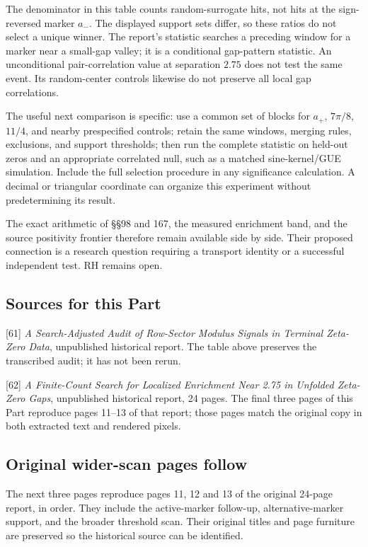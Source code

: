 \documentclass[
  11pt,
]{book}
\begin{document}
The denominator in this table counts random-surrogate hits, not hits at
the sign-reversed marker \(a_-\). The displayed support sets differ, so
these ratios do not select a unique winner. The report's statistic
searches a preceding window for a marker near a small-gap valley; it is
a conditional gap-pattern statistic. An unconditional pair-correlation
value at separation \(2.75\) does not test the same event. Its
random-center controls likewise do not preserve all local gap
correlations.

The useful next comparison is specific: use a common set of blocks for
\(a_+\), \(7\pi/8\), \(11/4\), and nearby prespecified controls; retain
the same windows, merging rules, exclusions, and support thresholds;
then run the complete statistic on held-out zeros and an appropriate
correlated null, such as a matched sine-kernel/GUE simulation. Include
the full selection procedure in any significance calculation. A decimal
or triangular coordinate can organize this experiment without
predetermining its result.

The exact arithmetic of §§98 and 167, the measured enrichment band, and
the source positivity frontier therefore remain available side by side.
Their proposed connection is a research question requiring a transport
identity or a successful independent test. RH remains open.

\subsection{Sources for this Part}\label{sources-for-this-part}

{[}61{]} \emph{A Search-Adjusted Audit of Row-Sector Modulus Signals in
Terminal Zeta-Zero Data}, unpublished historical report. The table above
preserves the transcribed audit; it has not been rerun.

{[}62{]} \emph{A Finite-Count Search for Localized Enrichment Near 2.75
in Unfolded Zeta-Zero Gaps}, unpublished historical report, 24 pages.
The final three pages of this Part reproduce pages 11--13 of that
report; those pages match the original copy in both extracted text and
rendered pixels.

\subsection{Original wider-scan pages
follow}\label{original-wider-scan-pages-follow}

The next three pages reproduce pages 11, 12 and 13 of the original
24-page report, in order. They include the active-marker follow-up,
alternative-marker support, and the broader threshold scan. Their
original titles and page furniture are preserved so the historical
source can be identified.
\end{document}
